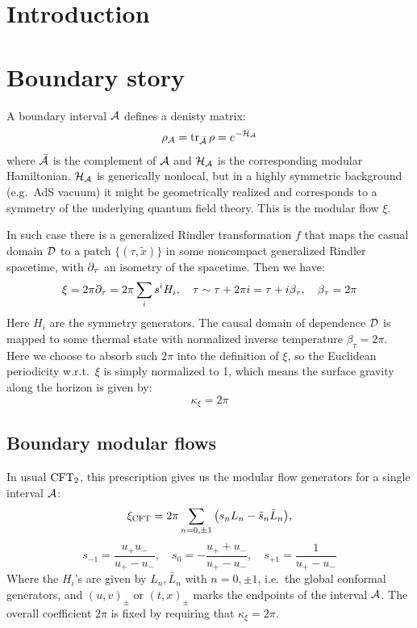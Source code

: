 \documentclass[11pt,a4paper]{article}
\begin{document}
	
\pagebreak

\section{Introduction}

\section{Boundary story}
	A boundary interval $\mathcal{A}$ defines a denisty matrix:
	\begin{equation}
		\rho_{\mathcal{A}}
		= \operatorname{tr}_{\bar{\mathcal{A}}} \rho
		= e^{-\mathcal{H}_{\mathcal{A}}}
	\end{equation}
	where $\bar{\mathcal{A}}$ is the complement of $\mathcal{A}$ and $\mathcal{H}_{\mathcal{A}}$ is the corresponding modular Hamiltonian. $\mathcal{H}_{\mathcal{A}}$ is generically nonlocal, but in a highly symmetric background (e.g.~AdS vacuum) it might be geometrically realized and corresponds to a symmetry of the underlying quantum field theory. This is the modular flow $\xi$. 
	
	In such case there is a generalized Rindler transformation $f$ that maps the casual domain $\mathcal{D}$ to a patch $\{(\tau,\tilde{x})\}$ in some noncompact generalized Rindler spacetime, with $\partial_{\tau}$ an isometry of the spacetime. Then we have:
	\begin{equation}
		\xi = 2\pi \partial_{\tau}
		= 2\pi \sum_i s^i H_i,
	\quad
		\tau \sim \tau + 2\pi i
		= \tau + i\beta_\tau,
	\quad
		\beta_\tau = 2\pi
	\end{equation}
	Here $H_i$ are the symmetry generators. The causal domain of dependence $\mathcal{D}$ is mapped to some thermal state with normalized inverse temperature $\beta_\tau = 2\pi$. Here we choose to absorb such $2\pi$ into the definition of $\xi$, so the Euclidean periodicity w.r.t.~$\xi$ is simply normalized to 1, which means the surface gravity along the horizon is given by:
	\begin{equation}
		\kappa_\xi = 2\pi
	\end{equation}
\subsection{Boundary modular flows}
	In usual $\mathrm{CFT}_2$, this prescription gives us the modular flow generators for a single interval $\mathcal{A}$:
	\begin{equation}
		\xi_\mrm{CFT} = 2\pi \sum_{n=0,\pm 1} \pqty{
				s_n L_n - \bar{s}_n \bar{L}_n
			},
	\end{equation}
	\begin{equation}
		s_{-1} = \frac{u_+ u_-}{u_+ - u_-},\quad
		s_0 = - \frac{u_+ + u_-}{u_+ - u_-},\quad
		s_{+1} = \frac{1}{u_+ - u_-}
	\end{equation}
	Where the $H_i$'s are given by $L_n,\bar{L}_n$ with $n=0,\pm 1$, i.e.~the global conformal generators, and $(u,v)_\pm$ or $(t,x)_\pm$ marks the endpoints of the interval $\mathcal{A}$. The overall coefficient $2\pi$ is fixed by requiring that $\kappa_\xi = 2\pi$. 
	
\end{document}
